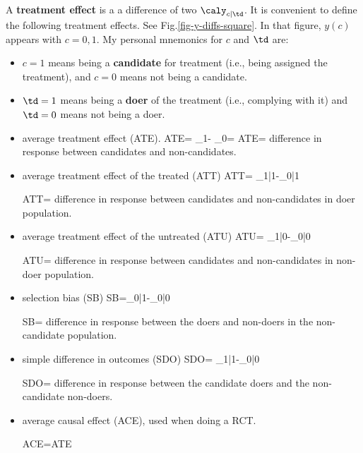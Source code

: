 A {\bf treatment effect} is a
a difference of two  $\caly_{c|\td }$.
It is convenient to
define the following
treatment effects.
See Fig.\ref{fig-y-diffs-square}.
In that figure, $y(c)$ appears  with
$c=0,1$.
My personal mnemonics
for $c$ and $\td$ are:
\begin{itemize}
\item
$c=1$ means being
a {\bf candidate} for treatment (i.e.,
being assigned the treatment),
and $c=0$ means not being a
candidate.
\item
$\td=1$ means being
a  {\bf doer} of the
treatment (i.e.,
complying with it)
and $\td=0$
means not being a doer.
\end{itemize}



\begin{itemize}


\item average treatment effect
 (ATE).
\beq
{\color{red}ATE}=
\caly_{1}-
\caly_{0}= \delta
\eeq
ATE= difference in
response between candidates
and non-candidates.

\item average treatment effect
of the treated (ATT)
\beq
{\color{red}ATT}=
\caly_{1|1}-\caly_{0|1}
\eeq

ATT= difference in
response between candidates
and non-candidates in doer
population.

\item average
treatment effect of the untreated (ATU)
\beq
{\color{red}ATU}=
\caly_{1|0}-\caly_{0|0}
\eeq

ATU= difference in
response between candidates
and non-candidates in non-doer
population.

\item selection bias (SB)
\beq
{\color{red}SB}=\caly_{0|1}-\caly_{0|0}
\eeq

SB= difference in response
between the doers and non-doers
in the non-candidate population.

\item simple difference in outcomes (SDO)
\beq
{\color{red} SDO}= \caly_{1|1}-\caly_{0|0}
\eeq

SDO= difference in
response between the candidate doers
and the non-candidate non-doers.

\item average
causal effect
 (ACE), used when doing a RCT.

\beq
{\color{red}ACE}=ATE 
\eeq


\end{itemize}

